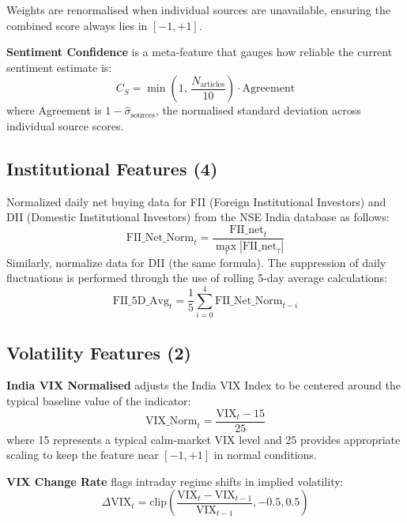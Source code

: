 \documentclass[10pt,a4paper,twoside]{article}
\begin{document}
Weights are renormalised when individual sources are unavailable, ensuring the
combined score always lies in $[-1, +1]$.

\textbf{Sentiment Confidence} is a meta-feature that gauges how reliable the
current sentiment estimate is:
\begin{equation}
  C_S = \min\!\left(1,\, \frac{N_{\text{articles}}}{10}\right)
        \cdot \text{Agreement}
\end{equation}
where Agreement is $1 - \hat{\sigma}_{\text{sources}}$, the normalised standard
deviation across individual source scores.

\subsection{Institutional Features (4)}

Normalized daily net buying data for FII (Foreign Institutional Investors) and DII (Domestic Institutional Investors) from the NSE India database as follows:
\begin{equation}
  \text{FII\_Net\_Norm}_t = \frac{\text{FII\_net}_t}{\max_\tau |\text{FII\_net}_\tau|}
\end{equation}
Similarly, normalize data for DII (the same formula). The suppression of daily fluctuations is performed through the use of rolling 5-day average calculations:
\begin{equation}
  \text{FII\_5D\_Avg}_t = \frac{1}{5}\sum_{i=0}^{4}\text{FII\_Net\_Norm}_{t-i}
\end{equation}

\subsection{Volatility Features (2)}

\textbf{India VIX Normalised} adjusts the India VIX Index to be centered around the typical baseline value of the indicator:
\begin{equation}
  \text{VIX\_Norm}_t = \frac{\text{VIX}_t - 15}{25}
\end{equation}
where 15 represents a typical calm-market VIX level and 25 provides appropriate
scaling to keep the feature near $[-1, +1]$ in normal conditions.

\textbf{VIX Change Rate} flags intraday regime shifts in implied volatility:
\begin{equation}
  \Delta\text{VIX}_t = \text{clip}\!\left(\frac{\text{VIX}_t - \text{VIX}_{t-1}}
  {\text{VIX}_{t-1}}, -0.5, 0.5\right)
\end{equation}
\end{document}
